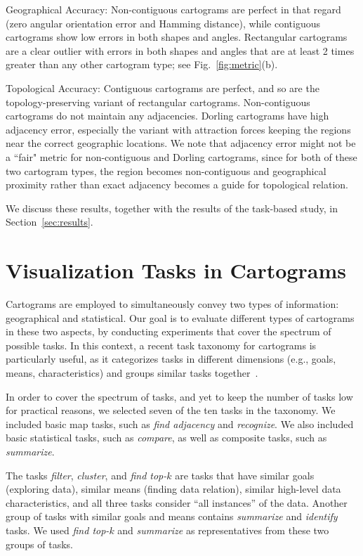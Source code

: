 \documentclass[10pt,journal,compsoc]{IEEEtran}
\begin{document}
Geographical Accuracy: Non-contiguous cartograms are perfect in that regard (zero angular orientation error and Hamming distance), while contiguous cartograms show low errors in both shapes and angles. Rectangular cartograms are a clear outlier with errors in both shapes and angles that are at least 2 times greater than any other cartogram type; see Fig.~\ref{fig:metric}(b).

Topological Accuracy: Contiguous cartograms are perfect, and so are the topology-preserving variant of rectangular cartograms. Non-contiguous cartograms do not maintain any adjacencies. Dorling cartograms have high adjacency error, especially the variant with attraction forces keeping the regions near the correct geographic locations. 
We note that adjacency error might not be a ``fair" metric for non-contiguous and Dorling cartograms, since for both of these two cartogram types, the region becomes non-contiguous and geographical proximity rather than exact adjacency becomes a guide for topological relation.

We discuss these results, together with the results of the task-based study, in Section~\ref{sec:results}.





\section{Visualization Tasks in Cartograms}
Cartograms are employed to simultaneously convey two types of information: geographical and statistical.
 Our goal is to evaluate different types of cartograms in these two aspects, by conducting experiments that cover the spectrum of possible tasks. In this context, a recent task taxonomy for cartograms is particularly useful, as it categorizes tasks in different dimensions (e.g., goals, means, characteristics) and groups similar tasks together~\cite{Task_C}. 
 
In order to cover the spectrum of tasks, and yet to keep the number of tasks low for practical reasons, we selected seven of the ten tasks in the taxonomy. We included basic map tasks, such as \textit{find adjacency} and 
 \textit{recognize}. We also included basic statistical tasks, such as \textit{compare}, as well as composite tasks, such as \textit{summarize}. 
 
The tasks \textit{filter}, \textit{cluster}, and \textit{find top-$k$} are tasks that have similar goals (exploring data), similar means (finding data relation), similar high-level data characteristics, and all three tasks consider ``all instances'' of the data. 
Another group of tasks with similar goals and means contains \textit{summarize} and \textit{identify} tasks.
We used \textit{find top-$k$} and \textit{summarize} as representatives from these two groups of tasks.
\end{document}
